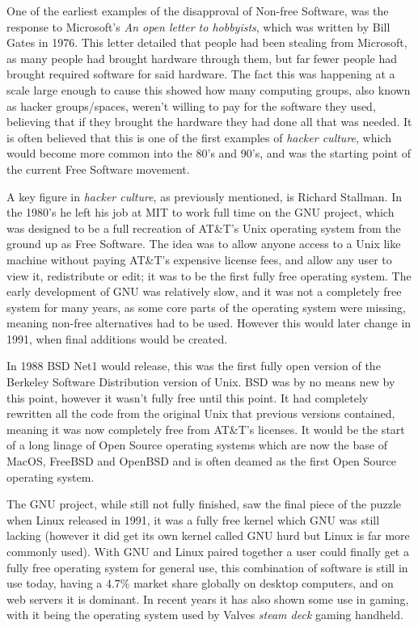 \documentclass[a4paper,12pt]{article}
\begin{document}
{One of the earliest examples of the disapproval of Non-free Software, was the response to Microsoft's 
\textit{An open letter to hobbyists}, which was written by Bill Gates in 1976. This letter detailed 
that people had been stealing from Microsoft, as many people had brought hardware through 
them, but far fewer people had brought required software for said hardware. The fact this was happening 
at a scale large enough to cause this showed how many computing groups, also known as hacker groups/spaces, 
weren't willing to pay for the software they used, believing that if they brought the hardware they had done 
all that was needed\cite{OPENletter}. It is often believed that this is one of the first examples 
of \textit{hacker culture}, which would become more common into the 80's and 90's, and was the 
starting point of the current Free Software movement.

A key figure in \textit{hacker culture}, as previously mentioned, is Richard Stallman. In the 
 1980's he left his job at MIT to work full time on the GNU project, which was designed
to be a full recreation of AT\&T's Unix operating system from the ground up as Free Software. 
The idea was to allow anyone access to a Unix like machine without paying AT\&T's expensive license 
fees, and allow any user to view it, redistribute or edit; it was to be the first fully free 
operating system. The early development of GNU was relatively slow, and it was not a completely free 
system for many years, as some core parts of the operating system were missing, meaning non-free 
alternatives had to be used. However this would later change in 1991, when final additions would
be created.

In 1988 BSD Net1 would release\cite{BSDnet1}, this was the first fully open version of the Berkeley 
Software Distribution version of Unix. BSD was by no means new by this point, however it wasn't 
fully free until this point. It had completely rewritten all the code from the original 
Unix that previous versions contained, meaning it was now completely free from AT\&T's licenses.
It would be the start of a long linage of Open Source operating systems which are now the base
of MacOS, FreeBSD and OpenBSD and is often deamed as the first Open Source operating system.

The GNU project, while still not fully finished, saw the final piece of the puzzle when 
Linux\cite{LINUX} released in 1991, it was a fully free kernel which GNU was still lacking (however 
it did get its own kernel called GNU hurd but Linux is far more commonly used). With GNU and Linux 
paired together a user could finally get a fully free operating system for general use, this 
combination of software is still in use today, having a 4.7\% market share globally on desktop
computers\cite{LINUXmarket}, and on web servers it is dominant. In recent years it has also shown
some use in gaming, with it being the operating system used by Valves \textit{steam deck} gaming 
handheld\cite{STEAMdeck}.

}
\end{document}
